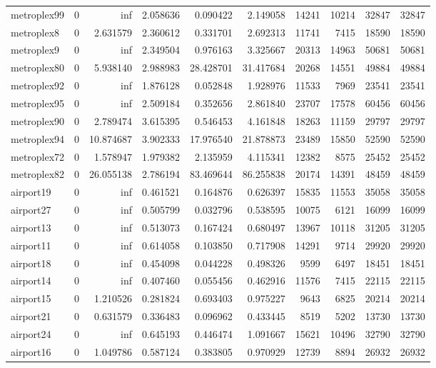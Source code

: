 \begin{longtable}{|l|r|r|r|r|r|r|r|r|r|}
metroplex99 & 0 & inf & 2.058636 & 0.090422 & 2.149058 & 14241 & 10214 & 32847 & 32847 \\
metroplex8 & 0 & 2.631579 & 2.360612 & 0.331701 & 2.692313 & 11741 & 7415 & 18590 & 18590 \\
metroplex9 & 0 & inf & 2.349504 & 0.976163 & 3.325667 & 20313 & 14963 & 50681 & 50681 \\
metroplex80 & 0 & 5.938140 & 2.988983 & 28.428701 & 31.417684 & 20268 & 14551 & 49884 & 49884 \\
metroplex92 & 0 & inf & 1.876128 & 0.052848 & 1.928976 & 11533 & 7969 & 23541 & 23541 \\
metroplex95 & 0 & inf & 2.509184 & 0.352656 & 2.861840 & 23707 & 17578 & 60456 & 60456 \\
metroplex90 & 0 & 2.789474 & 3.615395 & 0.546453 & 4.161848 & 18263 & 11159 & 29797 & 29797 \\
metroplex94 & 0 & 10.874687 & 3.902333 & 17.976540 & 21.878873 & 23489 & 15850 & 52590 & 52590 \\
metroplex72 & 0 & 1.578947 & 1.979382 & 2.135959 & 4.115341 & 12382 & 8575 & 25452 & 25452 \\
metroplex82 & 0 & 26.055138 & 2.786194 & 83.469644 & 86.255838 & 20174 & 14391 & 48459 & 48459 \\
airport19 & 0 & inf & 0.461521 & 0.164876 & 0.626397 & 15835 & 11553 & 35058 & 35058 \\
airport27 & 0 & inf & 0.505799 & 0.032796 & 0.538595 & 10075 & 6121 & 16099 & 16099 \\
airport13 & 0 & inf & 0.513073 & 0.167424 & 0.680497 & 13967 & 10118 & 31205 & 31205 \\
airport11 & 0 & inf & 0.614058 & 0.103850 & 0.717908 & 14291 & 9714 & 29920 & 29920 \\
airport18 & 0 & inf & 0.454098 & 0.044228 & 0.498326 & 9599 & 6497 & 18451 & 18451 \\
airport14 & 0 & inf & 0.407460 & 0.055456 & 0.462916 & 11576 & 7415 & 22115 & 22115 \\
airport15 & 0 & 1.210526 & 0.281824 & 0.693403 & 0.975227 & 9643 & 6825 & 20214 & 20214 \\
airport21 & 0 & 0.631579 & 0.336483 & 0.096962 & 0.433445 & 8519 & 5202 & 13730 & 13730 \\
airport24 & 0 & inf & 0.645193 & 0.446474 & 1.091667 & 15621 & 10496 & 32790 & 32790 \\
airport16 & 0 & 1.049786 & 0.587124 & 0.383805 & 0.970929 & 12739 & 8894 & 26932 & 26932 \\

\end{longtable}
